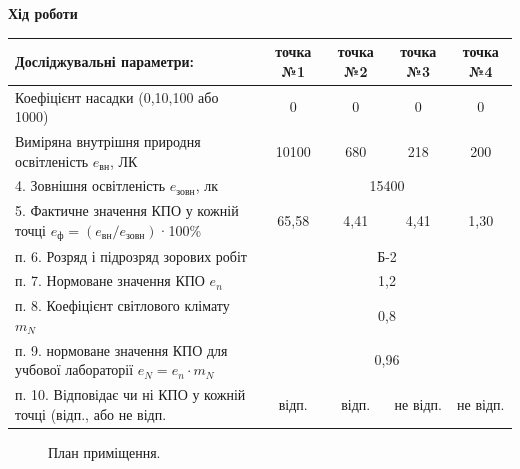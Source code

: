 \documentclass[a4paper,14pt]{extreport}
\begin{document}
\newpage
\begin{landscape}
\begin{center}\textbf{Хід роботи}\end{center}
\begin{table}[h]
\begin{tabular}{|l|c|c|c|c|}
\hline
Досліджувальні параметри:                                    & точка №1 & точка №2 & точка №3 & точка №4 \\ \hline
Коефіцієнт насадки (0,10,100 або 1000)                         &   0      &   0      &    0     &   0      \\ \hline
Виміряна внутрішня  природня освітленість $e_{\text{вн}}$, ЛК            &   10100  &    680   &  218     &  200     \\ \hline
4. Зовнішня освітленість $e_{\text{зовн}}$, лк                           & \multicolumn{4}{c|}{15400}            \\ \hline
5. Фактичне значення КПО у кожній точці $e_{\text{ф}}=(e_{\text{вн}}/e_{\text{зовн}})$·100\% &    65,58       &   4,41       &    4,41       &     1,30       \\ \hline                   
п. 6. Розряд і підрозряд зорових робіт                       & \multicolumn{4}{c|}{Б-2}                     \\ \hline
п. 7. Нормоване значення КПО $e_n$                              & \multicolumn{4}{c|}{1,2}                     \\ \hline
п. 8. Коефіцієнт світлового клімату $m_N$                        & \multicolumn{4}{c|}{0,8}                     \\ \hline
п. 9. нормоване значення КПО для учбової лабораторії $e_N = e_n\cdot m_N$& \multicolumn{4}{c|}{0,96}                     \\ \hline
п. 10. Відповідає чи ні КПО у кожній точці (відп., або не відп.&  відп.    &  відп.     &   не відп.     & не відп.    \\ \hline

\end{tabular}
\end{table}

\begin{figure}[h]
\caption{План приміщення.}
\end{figure}
\end{landscape}
\end{document}
